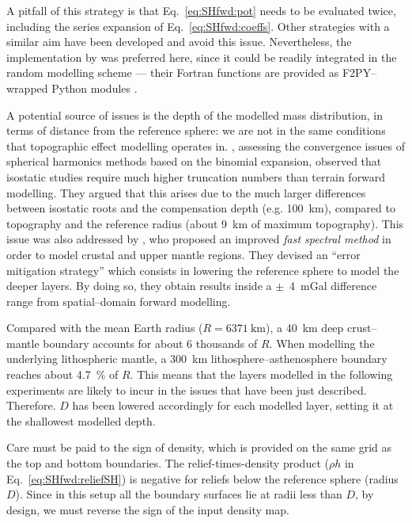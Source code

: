 A pitfall of this strategy is that Eq.~\ref{eq:SHfwd:pot} needs to be evaluated twice, including the series expansion of Eq.~\ref{eq:SHfwd:coeffs}.
Other strategies with a similar aim have been developed \parencite[e.g.][]{Novak2006} and avoid this issue.
Nevertheless, the implementation by \textcite{Wieczorek2018} was preferred here, since it could be readily integrated in the random modelling scheme --- their Fortran functions are provided as {F2PY}--wrapped Python modules \parencite{Peterson2009}.

A potential source of issues is the depth of the modelled mass distribution, in terms of distance from the reference sphere: we are not in the same conditions that topographic effect modelling operates in.
\Textcite{Sun2001}, assessing the convergence issues of spherical harmonics methods based on the binomial expansion, observed that isostatic studies require much higher truncation numbers than terrain forward modelling.
They argued that this arises due to the much larger differences between isostatic roots and the compensation depth (e.g. \SI{100}{\kilo \metre}), compared to topography and the reference radius (about \SI{9}{\kilo \metre} of maximum topography).
This issue was also addressed by \textcite{Root2015}, who proposed an improved \textit{fast spectral method} \parencites{Rummel1988}{Novak2006} in order to model crustal and upper mantle regions.
They devised an ``error mitigation strategy'' which consists in lowering the reference sphere to model the deeper layers.
By doing so, they obtain results inside a $\pm$~\SI{4}{\milli Gal} difference range from spatial--domain forward modelling.

Compared with the mean Earth radius ($R = \SI{6371}{\kilo \metre}$), a \SI{40}{\kilo \metre} deep crust--mantle boundary accounts for about 6 thousands of $R$.
When modelling the underlying lithospheric mantle, a \SI{300}{\kilo \metre} lithosphere--asthenosphere boundary reaches about \SI{4.7}{\percent} of $R$.
This means that the layers modelled in the following experiments are likely to incur in the issues that have been just described.
Therefore. $D$ has been lowered accordingly for each modelled layer, setting it at the shallowest modelled depth.

Care must be paid to the sign of density, which is provided on the same grid as the top and bottom boundaries.
The relief-times-density product ($\rho h$ in Eq.~\ref{eq:SHfwd:reliefSH}) is negative for reliefs below the reference sphere (radius $D$).
Since in this setup all the boundary surfaces lie at radii less than $D$, by design, we must reverse the sign of the input density map.

